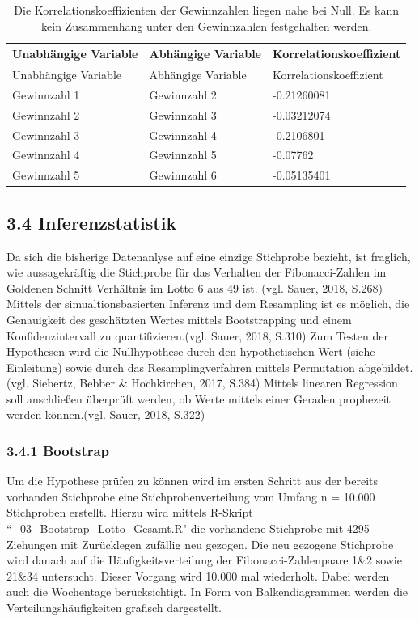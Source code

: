 \documentclass[ngerman,]{article}
\begin{document}
\begin{longtable}[]{@{}lll@{}}
\caption{Die Korrelationskoeffizienten der Gewinnzahlen liegen nahe bei
Null. Es kann kein Zusammenhang unter den Gewinnzahlen festgehalten
werden.}\tabularnewline
\toprule
Unabhängige Variable & Abhängige Variable &
Korrelationskoeffizient\tabularnewline
\midrule
\endfirsthead
\toprule
Unabhängige Variable & Abhängige Variable &
Korrelationskoeffizient\tabularnewline
\midrule
\endhead
Gewinnzahl 1 & Gewinnzahl 2 & -0.21260081\tabularnewline
Gewinnzahl 2 & Gewinnzahl 3 & -0.03212074\tabularnewline
Gewinnzahl 3 & Gewinnzahl 4 & -0.2106801\tabularnewline
Gewinnzahl 4 & Gewinnzahl 5 & -0.07762\tabularnewline
Gewinnzahl 5 & Gewinnzahl 6 & -0.05135401\tabularnewline
\bottomrule
\end{longtable}

\newpage

\subsection{3.4 Inferenzstatistik}\label{inferenzstatistik}

Da sich die bisherige Datenanlyse auf eine einzige Stichprobe bezieht,
ist fraglich, wie aussagekräftig die Stichprobe für das Verhalten der
Fibonacci-Zahlen im Goldenen Schnitt Verhältnis im Lotto 6 aus 49 ist.
(vgl. Sauer, 2018, S.268) Mittels der simualtionsbasierten Inferenz und
dem Resampling ist es möglich, die Genauigkeit des geschätzten Wertes
mittels Bootstrapping und einem Konfidenzintervall zu
quantifizieren.(vgl. Sauer, 2018, S.310) Zum Testen der Hypothesen wird
die Nullhypothese durch den hypothetischen Wert (siehe Einleitung) sowie
durch das Resamplingverfahren mittels Permutation abgebildet. (vgl.
Siebertz, Bebber \& Hochkirchen, 2017, S.384) Mittels linearen
Regression soll anschließen überprüft werden, ob Werte mittels einer
Geraden prophezeit werden können.(vgl. Sauer, 2018, S.322)

\subsubsection{3.4.1 Bootstrap}\label{bootstrap}

Um die Hypothese prüfen zu können wird im ersten Schritt aus der bereits
vorhanden Stichprobe eine Stichprobenverteilung vom Umfang n = 10.000
Stichproben erstellt. Hierzu wird mittels R-Skript
``\_03\_Bootstrap\_Lotto\_Gesamt.R" die vorhandene Stichprobe mit 4295
Ziehungen mit Zurücklegen zufällig neu gezogen. Die neu gezogene
Stichprobe wird danach auf die Häufigkeitsverteilung der
Fibonacci-Zahlenpaare 1\&2 sowie 21\&34 untersucht. Dieser Vorgang wird
10.000 mal wiederholt. Dabei werden auch die Wochentage berücksichtigt.
In Form von Balkendiagrammen werden die Verteilungshäufigkeiten grafisch
dargestellt.
\end{document}
